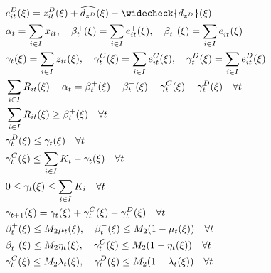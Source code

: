 \documentclass[10pt]{article}
\begin{document}
\begin{subequations}
\begin{align*}
    &e^D_{it}(\xi) = z^D_{it}(\xi) + \widehat{d_{z^D}}(\xi) - \widecheck{d_{z^D}}(\xi) &\\
    &\alpha_t = \sum_{i\in I}x_{it}, \quad \beta_t^+(\xi) = \sum_{i\in I}e^+_{it}(\xi), \quad \beta_t^-(\xi) = \sum_{i\in I}e^-_{it}(\xi)&\\
    &\gamma_t(\xi) = \sum_{i\in I}z_{it}(\xi), \quad \gamma^C_t(\xi) = \sum_{i\in I}e^C_{it}(\xi), \quad \gamma^D_t(\xi) = \sum_{i\in I}e^D_{it}(\xi)&\\
    & \sum_{i \in I} R_{it}(\xi) - \alpha_t = \beta^+_t(\xi) - \beta^-_t(\xi) + \gamma^C_t(\xi) - \gamma^D_t(\xi) \quad \forall t &\\
    &\sum_{i\in I}R_{it}(\xi) \geq \beta_{t}^{+}(\xi) \quad \forall t &\\ 
    &\gamma^D_t(\xi) \le \gamma_{t}(\xi) \quad \forall t &\\
    &\gamma^C_t(\xi) \le \sum_{i \in I}K_i - \gamma_{t}(\xi) \quad \forall t &\\
    &0 \leq \gamma_t(\xi) \leq \sum_{i \in I} K_i \quad \forall t &\\
    &\gamma_{t+1}(\xi) = \gamma_{t}(\xi) + \gamma^C_t(\xi) - \gamma^D_t(\xi) \quad \forall t &\\
    &\beta^+_t(\xi) \le M_2 \mu_t(\xi), \quad \beta^-_t(\xi) \le M_2 (1 - \mu_t(\xi)) \quad \forall t &\\ 
    &\beta^-_t(\xi) \le M_2 \eta_t(\xi), \quad \gamma^C_t(\xi) \le M_2 (1 - \eta_t(\xi))\quad \forall t &\\
    &\gamma^C_t(\xi) \le M_2\lambda_t(\xi), \quad \gamma^D_t(\xi) \le M_2(1 - \lambda_t(\xi)) \quad \forall t &
    \end{align*}
\end{subequations}
\end{document}
